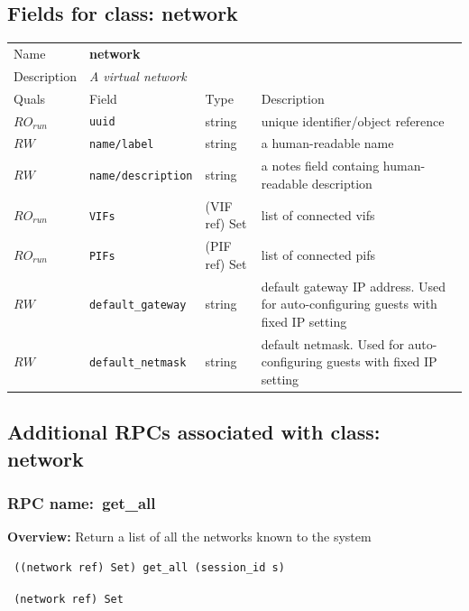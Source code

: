 \subsection{Fields for class: network}
\begin{longtable}{|lllp{}|}
\hline
\multicolumn{1}{|l}{Name} & \multicolumn{3}{l|}{\bf network} \\
\multicolumn{1}{|l}{Description} & \multicolumn{3}{l|}{\parbox{11cm}{\em A virtual network}} \\
\hline
Quals & Field & Type & Description \\
\hline
$\mathit{RO}_\mathit{run}$ &  {\tt uuid} & string & unique identifier/object reference \\
$\mathit{RW}$ &  {\tt name/label} & string & a human-readable name \\
$\mathit{RW}$ &  {\tt name/description} & string & a notes field containg human-readable description \\
$\mathit{RO}_\mathit{run}$ &  {\tt VIFs} & (VIF ref) Set & list of connected vifs \\
$\mathit{RO}_\mathit{run}$ &  {\tt PIFs} & (PIF ref) Set & list of connected pifs \\
$\mathit{RW}$ &  {\tt default\_gateway} & string & default gateway IP address. Used for auto-configuring guests with fixed IP setting \\
$\mathit{RW}$ &  {\tt default\_netmask} & string & default netmask. Used for auto-configuring guests with fixed IP setting \\
\hline
\end{longtable}
\subsection{Additional RPCs associated with class: network}
\subsubsection{RPC name:~get\_all}

{\bf Overview:} 
Return a list of all the networks known to the system

\begin{verbatim} ((network ref) Set) get_all (session_id s)\end{verbatim}


\vspace{0.3cm}

{\tt 
(network ref) Set
}


